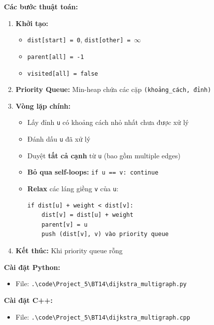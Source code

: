 \documentclass[12pt,a4paper]{article}
\begin{document}
\textbf{Các bước thuật toán:}

\begin{enumerate}
    \item \textbf{Khởi tạo:}
    \begin{itemize}[label=\textbullet]
        \item \texttt{dist[start] = 0}, \texttt{dist[other] = $\infty$}
        \item \texttt{parent[all] = -1}
        \item \texttt{visited[all] = false}
    \end{itemize}

    \item \textbf{Priority Queue:} Min-heap chứa các cặp \texttt{(khoảng\_cách, đỉnh)}

    \item \textbf{Vòng lặp chính:}
    \begin{itemize}[label=\textbullet]
        \item Lấy đỉnh \texttt{u} có khoảng cách nhỏ nhất chưa được xử lý
        \item Đánh dấu \texttt{u} đã xử lý
        \item Duyệt \textbf{tất cả cạnh} từ \texttt{u} (bao gồm multiple edges)
        \item \textbf{Bỏ qua self-loops:} \texttt{if u == v: continue}
        \item \textbf{Relax} các láng giềng \texttt{v} của \texttt{u}:
        \begin{verbatim}
if dist[u] + weight < dist[v]:
    dist[v] = dist[u] + weight
    parent[v] = u
    push (dist[v], v) vào priority queue
        \end{verbatim}
    \end{itemize}

    \item \textbf{Kết thúc:} Khi priority queue rỗng
\end{enumerate}


\textbf{Cài đặt Python:}
\begin{itemize}[label=\textbullet]
   \item File: \texttt{.\textbackslash code\textbackslash Project\_5\textbackslash BT14\textbackslash dijkstra\_multigraph.py}
\end{itemize}

\textbf{Cài đặt C++:}
\begin{itemize}[label=\textbullet]
   \item File: \texttt{.\textbackslash code\textbackslash Project\_5\textbackslash BT14\textbackslash dijkstra\_multigraph.cpp}
\end{itemize}
\end{document}
